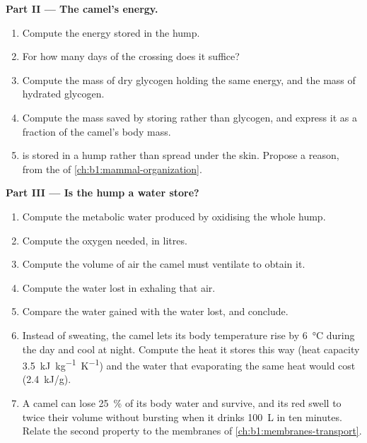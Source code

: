 \begin{problem}
\medskip
\noindent\textbf{Part II --- The camel's energy.}
\begin{enumerate}[resume]
  \item Compute the energy stored in the hump.
  \item For how many days of the crossing does it suffice?
  \item Compute the mass of dry glycogen holding the same energy, and
        the mass of hydrated glycogen.
  \item Compute the mass saved by storing  rather than glycogen, and
        express it as a fraction of the camel's body mass.
  \item {} is stored in a hump rather than spread under the skin.
        Propose a reason, from the  of
        \cref{ch:b1:mammal-organization}.
\end{enumerate}

\medskip
\noindent\textbf{Part III --- Is the hump a water store?}
\begin{enumerate}[resume]
  \item Compute the metabolic water produced by oxidising the whole
        hump.
  \item Compute the oxygen needed, in litres.
  \item Compute the volume of air the camel must ventilate to obtain
        it.
  \item Compute the water lost in exhaling that air.
  \item Compare the water gained with the water lost, and conclude.
  \item Instead of sweating, the camel lets its body temperature rise
        by \qty{6}{\celsius} during the day and cool at night. Compute
        the heat it stores this way (heat capacity
        \qty{3.5}{kJ.kg^{-1}.K^{-1}}) and the water that evaporating
        the same heat would cost (\qty{2.4}{kJ/g}).
  \item A camel can lose \qty{25}{\%} of its body water and survive,
        and its red  swell to twice their volume without bursting
        when it drinks \qty{100}{L} in ten minutes. Relate the second
        property to the membranes of \cref{ch:b1:membranes-transport}.
\end{enumerate}


\end{problem}
